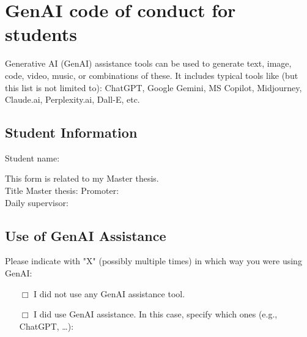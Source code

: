 \chapter{GenAI code of conduct for students}

Generative AI (GenAI) assistance tools can be used to generate text, image, code, video, music, or combinations of these. It includes typical tools like (but this list is not limited to): ChatGPT, Google Gemini, MS Copilot, Midjourney, Claude.ai, Perplexity.ai, Dall-E, etc.

\section*{Student Information}
\begin{tabbing}
\makeatletter%
Student name: \@forenameA \ \@surnameA
\makeatother
\end{tabbing}

This form is related to my Master thesis. \\

Title Master thesis: \underline{\hspace{5cm}} \hspace{1cm} Promoter: \underline{\hspace{5cm}} \\
Daily supervisor: \underline{\hspace{5cm}}

\section*{Use of GenAI Assistance}
Please indicate with "X" (possibly multiple times) in which way you were using GenAI:

\begin{itemize}
    \item[$\Box$] I did not use any GenAI assistance tool.
    \item[$\Box$] I did use GenAI assistance. In this case, specify which ones (e.g., ChatGPT, \ldots): \underline{\hspace{5cm}}
\end{itemize}


